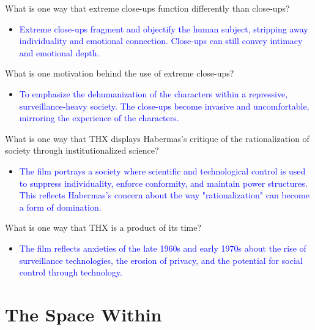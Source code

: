 \documentclass[11pt,fleqn]{book} %
\begin{document}
\begin{exercise}
What is one way that extreme close-ups function differently than close-ups?
\begin{itemize}
\item \textcolor{blue}{Extreme close-ups fragment and objectify the human subject, stripping away individuality and emotional connection. Close-ups can still convey intimacy and emotional depth.}
\end{itemize}
\end{exercise}

\begin{exercise}
What is one motivation behind the use of extreme close-ups?
\begin{itemize}
\item \textcolor{blue}{To emphasize the dehumanization of the characters within a repressive, surveillance-heavy society. The close-ups become invasive and uncomfortable, mirroring the experience of the characters.}
\end{itemize}
\end{exercise}

\begin{exercise}
What is one way that THX displays Habermas's critique of the rationalization of society through institutionalized science?
\begin{itemize}
\item \textcolor{blue}{The film portrays a society where scientific and technological control is used to suppress individuality, enforce conformity, and maintain power structures. This reflects Habermas's concern about the way "rationalization" can become a form of domination.}
\end{itemize}
\end{exercise}

\begin{exercise}
What is one way that THX is a product of its time?
\begin{itemize}
\item \textcolor{blue}{The film reflects anxieties of the late 1960s and early 1970s about the rise of surveillance technologies, the erosion of privacy, and the potential for social control through technology.}
\end{itemize}
\end{exercise}





\section{The Space Within}
\end{document}
